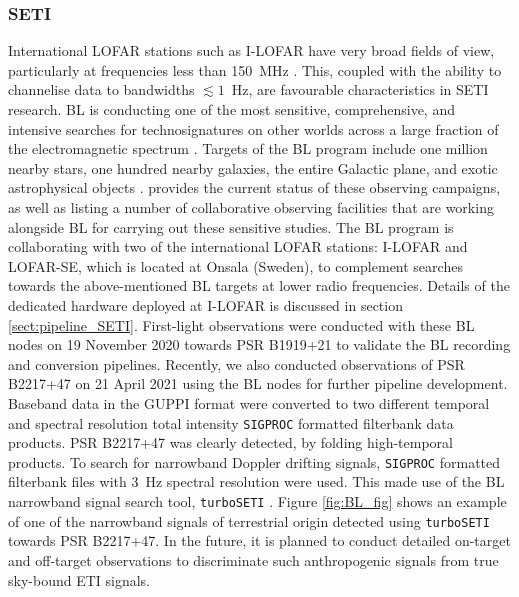 \subsubsection{SETI}
International LOFAR stations such as I-LOFAR have very broad fields of view, particularly at frequencies less than 150~MHz \citep{VanHaarlem2013}. This, coupled with the ability to channelise data to bandwidths $\lesssim 1$~Hz, are favourable characteristics in SETI research.
BL is conducting one of the most sensitive, comprehensive, and intensive searches for technosignatures on other worlds across a large fraction of the electromagnetic spectrum \citep{Worden2017}. Targets of the BL program include one million nearby stars, one hundred nearby galaxies, the entire Galactic plane, and exotic astrophysical objects \citep[see][for detail]{Isaacson2017}. \cite{Gajjar2019} provides the current status of these observing campaigns, as well as listing a number of collaborative observing facilities that are working alongside BL for carrying out these sensitive studies. The BL program is collaborating with two of the international LOFAR stations: I-LOFAR and LOFAR-SE, which is located at Onsala (Sweden), to complement searches towards the above-mentioned BL targets at lower radio frequencies. Details of the dedicated hardware deployed at I-LOFAR is discussed in section \ref{sect:pipeline_SETI}. First-light observations were conducted with these BL nodes on 19 November 2020 towards PSR B1919+21 to validate the BL recording and conversion pipelines.
Recently, we also conducted observations of PSR B2217+47 on 21 April 2021 using the BL nodes for further pipeline development. Baseband data in the GUPPI format were converted to two different temporal and spectral resolution total intensity \texttt{SIGPROC} formatted filterbank data products. PSR B2217+47 was clearly detected, by folding high-temporal products. To search for narrowband Doppler drifting signals, \texttt{SIGPROC} formatted filterbank files with 3~Hz spectral resolution were used. This made use of the BL narrowband signal search tool, \texttt{turboSETI} \citep{Enriquez2017}. Figure \ref{fig:BL_fig} shows an example of one of the narrowband signals of terrestrial origin detected using \texttt{turboSETI} towards PSR B2217+47. In the future, it is planned to conduct detailed on-target and off-target observations to discriminate such anthropogenic signals from true sky-bound ETI signals. 


